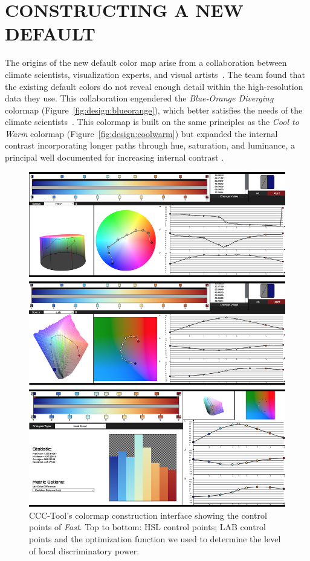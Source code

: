 \documentclass{IEEEcsmag}
\newcommand*{\colormap}[1]{\textsl{#1}\xspace}
\newcommand*{\coolwarm}{\colormap{Cool to Warm}}
\newcommand*{\blueorange}{\colormap{Blue-Orange Diverging}}
\newcommand*{\fast}{\colormap{Fast}}
\begin{document}
\section{CONSTRUCTING A NEW DEFAULT}
The origins of the new default color map arise from a collaboration between climate scientists, visualization experts, and visual artists~\cite{Samsel2015}.
The team found that the existing default colors do not reveal enough detail within the high-resolution data they use.
This collaboration engendered the \blueorange colormap (Figure~\ref{fig:design:blueorange}), which better satisfies the needs of the climate scientists~\cite{Samsel2015:SC}.
This colormap is built on the same principles as the \coolwarm colormap (Figure~\ref{fig:design:coolwarm}) but expanded the internal contrast incorporating longer paths through hue, saturation, and luminance, a principal well documented for increasing internal contrast \cite{Ware2023}.


\begin{figure}[t]
\includegraphics[width=\columnwidth]{Final_Pics/30F_combo.png}
\centering
\caption{CCC-Tool's colormap construction interface showing the control points of \fast. Top to bottom: HSL control points; LAB control points and the optimization function we used to determine the level of local discriminatory power.}
\label{CCC1}
\end{figure}
\end{document}
